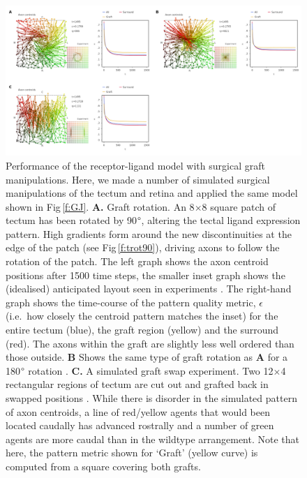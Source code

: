 \documentclass[9pt,lineno]{elife}
\begin{document}
\begin{figure}
\begin{fullwidth}
\includegraphics[width=0.95\linewidth]{./images/fig_GJ_surgical_grafts.png}
\caption{Performance of the receptor-ligand model with surgical graft manipulations. Here, we made a number of simulated surgical manipulations of the tectum and retina and applied the same model shown in Fig\,\ref{f:GJ}. \textbf{A.} Graft rotation. An 8$\times$8 square patch of tectum has been rotated by 90$\degree$, altering the tectal ligand expression pattern. High gradients form around the new discontinuities at the edge of the patch (see Fig\,\ref{f:trot90}), driving axons to follow the rotation of the patch. The left graph shows the axon centroid positions after 1500 time steps, the smaller inset graph shows the (idealised) anticipated layout seen in experiments \citep{levine_deployment_1974}. The right-hand graph shows the time-course of the pattern quality metric, $\epsilon$ (i.e.~how closely the centroid pattern matches the inset) for the entire tectum (blue), the graft region (yellow) and the surround (red). The axons within the graft are slightly less well ordered than those outside. \textbf{B} Shows the same type of graft rotation as \textbf{A} for a 180$\degree$ rotation \citep{yoon_retention_1973}. \textbf{C.} A simulated graft swap experiment. Two 12$\times$4 rectangular regions of tectum are cut out and grafted back in swapped positions \citep{hope_arrow_1976,gaze_visuotectal_1983}. While there is disorder in the simulated pattern of axon centroids, a line of red/yellow agents that would been located caudally has advanced rostrally and a number of green agents are more caudal than in the wildtype arrangement. Note that here, the pattern metric shown for `Graft' (yellow curve) is computed from a square covering both grafts.}
\label{f:GJsurg_grafts}
\end{fullwidth}
\end{figure}
\end{document}
